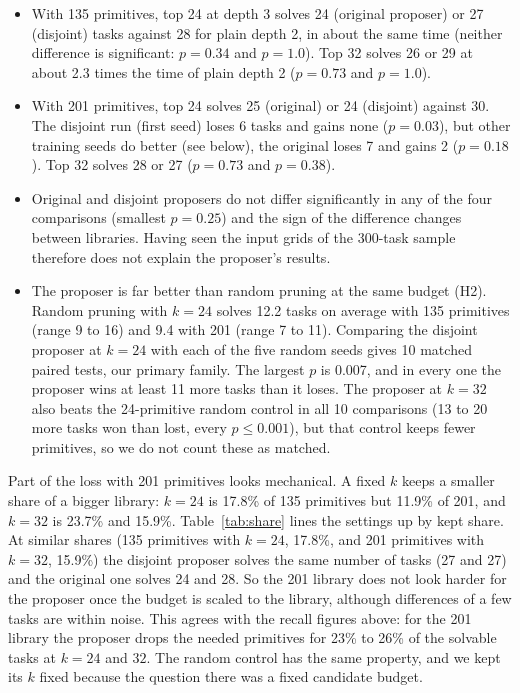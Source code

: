 \documentclass[sigconf,nonacm]{acmart}
\begin{document}
\begin{itemize}
  \item With 135 primitives, top 24 at depth 3 solves 24 (original proposer) or 27 (disjoint) tasks against 28 for plain depth 2, in about the same time (neither difference is significant: $p=0.34$ and $p=1.0$). Top 32 solves 26 or 29 at about 2.3 times the time of plain depth 2 ($p=0.73$ and $p=1.0$).
  \item With 201 primitives, top 24 solves 25 (original) or 24 (disjoint) against 30. The disjoint run (first seed) loses 6 tasks and gains none ($p=0.03$), but other training seeds do better (see below), the original loses 7 and gains 2 ($p=0.18$). Top 32 solves 28 or 27 ($p=0.73$ and $p=0.38$).
  \item Original and disjoint proposers do not differ significantly in any of the four comparisons (smallest $p=0.25$) and the sign of the difference changes between libraries. Having seen the input grids of the 300-task sample therefore does not explain the proposer's results.
  \item The proposer is far better than random pruning at the same budget (H2). Random pruning with $k=24$ solves 12.2 tasks on average with 135 primitives (range 9 to 16) and 9.4 with 201 (range 7 to 11). Comparing the disjoint proposer at $k=24$ with each of the five random seeds gives 10 matched paired tests, our primary family. The largest $p$ is 0.007, and in every one the proposer wins at least 11 more tasks than it loses. The proposer at $k=32$ also beats the 24-primitive random control in all 10 comparisons (13 to 20 more tasks won than lost, every $p\le 0.001$), but that control keeps fewer primitives, so we do not count these as matched.
\end{itemize}

Part of the loss with 201 primitives looks mechanical. A fixed $k$ keeps a smaller share of a bigger library: $k=24$ is 17.8\% of 135 primitives but 11.9\% of 201, and $k=32$ is 23.7\% and 15.9\%. Table~\ref{tab:share} lines the settings up by kept share. At similar shares (135 primitives with $k=24$, 17.8\%, and 201 primitives with $k=32$, 15.9\%) the disjoint proposer solves the same number of tasks (27 and 27) and the original one solves 24 and 28. So the 201 library does not look harder for the proposer once the budget is scaled to the library, although differences of a few tasks are within noise. This agrees with the recall figures above: for the 201 library the proposer drops the needed primitives for 23\% to 26\% of the solvable tasks at $k=24$ and $32$. The random control has the same property, and we kept its $k$ fixed because the question there was a fixed candidate budget.
\end{document}
